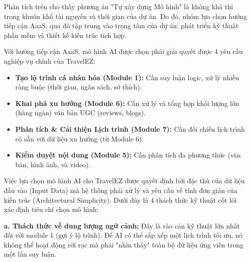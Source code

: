 Phân tích trên cho thấy phương án "Tự xây dựng Mô hình" là không khả thi trong khuôn khổ tài nguyên và thời gian của dự án. Do đó, nhóm lựa chọn hướng tiếp cận AaaS, qua đó tập trung vào trọng tâm của dự án: phát triển kỹ thuật phần mềm và thiết kế kiến trúc tích hợp.

Với hướng tiếp cận AaaS, mô hình AI được chọn phải giải quyết được 4 yêu cầu nghiệp vụ chính của TravelEZ:

\begin{itemize}
    \item \textbf{Tạo lộ trình cá nhân hóa (Module 1):} Cần suy luận logic, xử lý nhiều ràng buộc (thời gian, ngân sách, sở thích).
    \item \textbf{Khai phá xu hướng (Module 6):} Cần xử lý và tổng hợp khối lượng lớn (hàng ngàn) văn bản UGC (reviews, blogs).
    \item \textbf{Phân tích \& Cải thiện Lịch trình (Module 7):} Cần đối chiếu lịch trình có sẵn với dữ liệu xu hướng (từ Module 6).
    \item \textbf{Kiểm duyệt nội dung (Module 5):} Cần phân tích đa phương thức (văn bản, hình ảnh, và video).
\end{itemize}


Việc lựa chọn mô hình AI cho TravelEZ được quyết định bởi đặc thù của dữ liệu đầu vào (Input Data) mà hệ thống phải xử lý và yêu cầu về tính đơn giản của kiến trúc (Architectural Simplicity). Dưới đây là 4 thách thức kỹ thuật cốt lõi xác định tiêu chí chọn mô hình:

\textbf{a. Thách thức về dung lượng ngữ cảnh:} Đây là rào cản kỹ thuật lớn nhất đối với module 1 (gợi ý lộ trình). Để AI có thể sắp xếp một lịch trình tối ưu, nó không thể hoạt động rời rạc mà phải "nhìn thấy" toàn bộ dữ liệu ứng viên trong một lần suy luận.

